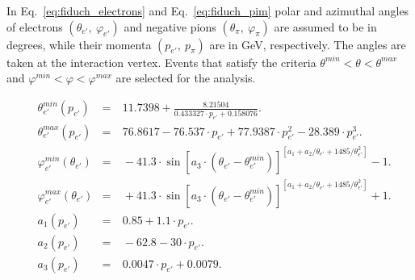 In Eq.~\eqref{eq:fiduch_electrons} and Eq.~\eqref{eq:fiduch_pim} polar and azimuthal angles of electrons $(\theta_{e'},~\varphi_{e'})$ and negative pions $(\theta_{\pi},~\varphi_{\pi})$ are assumed to be in degrees, while their momenta $(p_{e'},~p_{\pi})$ are in GeV, respectively. The angles are taken at the interaction vertex. Events that satisfy the criteria $\theta^{min} < \theta < \theta^{max}$ and $\varphi^{min} < \varphi < \varphi^{max}$ are selected for the analysis. 
\clearpage


\begin{equation}
\begin{aligned}
& \theta_{e'}^{min}(p_{e'})  & = &~11.7398+\frac{8.21504}{0.433327\cdot p_{e'}+0.158076}. \\[8pt]
& \theta_{e'}^{max}(p_{e'}) & = &~76.8617 -76.537\cdot p_{e'} + 77.9387\cdot p_{e'}^{2}-28.389\cdot p_{e'}^{3}.\\[8pt]
& \varphi_{e'}^{min}(\theta_{e'})  & = &~-41.3\!\cdot\! \sin\left [ a_{3}\cdot (\theta_{e'}-\theta_{e'}^{min}) \right ]^{\left [a_{1}+a_{2}/\theta_{e'}+1485/\theta_{e'}^{2}\right ]} -1.  \\[8pt]
& \varphi_{e'}^{max}(\theta_{e'})  & = &~+41.3\!\cdot\! \sin\left [ a_{3}\cdot (\theta_{e'}-\theta_{e'}^{min}) \right ]^{\left [a_{1}+a_{2}/\theta_{e'}+1485/\theta_{e'}^{2} \right ]}+1. \\[8pt]
& a_{1}(p_{e'})& = &~0.85+1.1\cdot p_{e'}.\\[8pt]
& a_{2}(p_{e'})& = &~-62.8-30\cdot p_{e'}.\\[8pt]
& a_{3}(p_{e'})& = &~ 0.0047\cdot p_{e'} + 0.0079.\\
\end{aligned} \label{eq:fiduch_electrons} 
\end{equation}

\vspace{2em}

